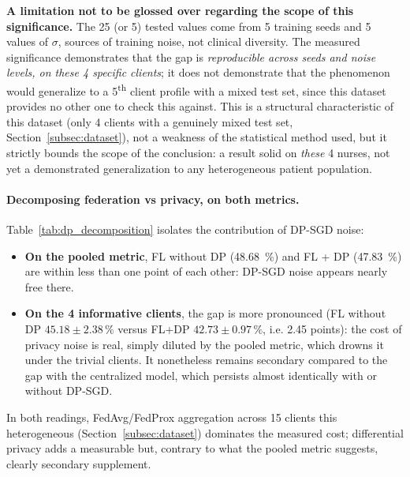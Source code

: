 \documentclass{article}
\begin{document}
\textbf{A limitation not to be glossed over regarding the scope of this
significance.} The 25 (or 5) tested values come from 5 training seeds and 5
values of $\sigma$, sources of training noise, not clinical diversity. The
measured significance demonstrates that the gap is \emph{reproducible across
seeds and noise levels, on these 4 specific clients}; it does not demonstrate
that the phenomenon would generalize to a 5\textsuperscript{th} client profile
with a mixed test set, since this dataset provides no other one to check this
against. This is a structural characteristic of this dataset (only 4 clients
with a genuinely mixed test set, Section~\ref{subsec:dataset}), not a weakness of
the statistical method used, but it strictly bounds the scope of the conclusion:
a result solid on \emph{these} 4 nurses, not yet a demonstrated generalization to
any heterogeneous patient population.

\paragraph{Decomposing federation vs privacy, on both metrics.}
Table~\ref{tab:dp_decomposition} isolates the contribution of DP-SGD noise:
\begin{itemize}
  \item \textbf{On the pooled metric}, FL without DP (48.68~\%) and FL + DP
  (47.83~\%) are within less than one point of each other: DP-SGD noise appears
  nearly free there.
  \item \textbf{On the 4 informative clients}, the gap is more pronounced (FL
  without DP $45.18 \pm 2.38\,\%$ versus FL+DP $42.73 \pm 0.97\,\%$, i.e. 2.45
  points): the cost of privacy noise is real, simply diluted by the pooled
  metric, which drowns it under the trivial clients. It nonetheless remains
  secondary compared to the gap with the centralized model, which persists
  almost identically with or without DP-SGD.
\end{itemize}
In both readings, FedAvg/FedProx aggregation across 15 clients this
heterogeneous (Section~\ref{subsec:dataset}) dominates the measured cost;
differential privacy adds a measurable but, contrary to what the pooled metric
suggests, clearly secondary supplement.
\end{document}
